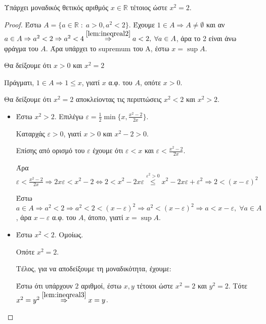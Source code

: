 \documentclass[main.tex]{subfiles}
\begin{document}
\begin{thm}
    Υπάρχει μοναδικός θετικός αριθμός $ x \in \mathbb{R} $ τέτοιος ώστε $ x^{2}=2 $.
\end{thm}

\begin{proof}
\item {}
    Έστω $ A = \{ a \in \mathbb{R} \; : \; a > 0, a^{2} < 2 \}  $. Έχουμε $ 1 \in A 
    \Rightarrow A \neq \emptyset $ 
    και αν $ a \in A \Rightarrow a^{2} < 2 \Rightarrow a^{2} < 4
    \overset{\ref{lem:ineqreal2}}{\Rightarrow} a <2,\; \forall a \in A $, 
    άρα το 2 είναι άνω φράγμα του $A$. Άρα υπάρχει το supremum του Α, έστω 
    $ x = \sup A $. 
    
    Θα δείξουμε ότι $ x > 0 $ και $ x^{2} = 2 $

    Πράγματι, $ 1 \in A \Rightarrow 1 \leq x $, γιατί $x$ α.φ. του $A$, οπότε $ x >0 $.

    Θα δείξουμε ότι $ x^{2} = 2 $ αποκλείοντας τις περιπτώσεις $ x^{2} <2 $ και 
    $ x^{2} > 2 $.
    \begin{itemize}
        \item Έστω $ x^{2} > 2 $. Επιλέγω $ \varepsilon = \frac{1}{2} \min \{ x, 
            \frac{x^{2}-2}{2x}\} $.
            
            Καταρχάς $ \varepsilon > 0 $, γιατί $ x>0 $ και $ x^{2} -2 >0 $. 
            
            Επίσης από ορισμό του $ \varepsilon $ έχουμε ότι  $\varepsilon < x $ και 
            $ \varepsilon < \frac{x^{2}-2}{2x}$. 

            Άρα $ \varepsilon < \frac{x^{2}-2}{2x} \Rightarrow 
            2x \varepsilon < x^{2} - 2 \Leftrightarrow 2 < x^{2} -2x \varepsilon 
            \overset{\varepsilon ^{2}>0}{\leq}
            x^{2} -2x \varepsilon + \varepsilon ^{2} \Rightarrow 2 
            < (x- \varepsilon )^{2}   $

            Έστω $ a \in A \Rightarrow a^{2} <2 \Rightarrow a^{2}<2< 
            (x- \varepsilon )^{2} \Rightarrow a^{2}< (x- \varepsilon )^{2} 
            \Rightarrow a < x- \varepsilon, \; \forall a \in A$, 
            άρα $ x - \varepsilon $ α.φ. του $A$, άτοπο, γιατί $ x= \sup A $.

        \item Έστω $ x^{2}<2 $. Ομοίως.

            Οπότε $ x^{2}=2 $. 

            Τέλος, για να αποδείξουμε τη μοναδικότητα, έχουμε:

            Έστω ότι υπάρχουν $ 2 $ αριθμοί, έστω $ x,y $ τέτοιοι ώστε $ x^{2} =2 $ 
            και $ y^{2}=2 $. Τότε $ x^{2}=y^{2} \overset{\ref{lem:ineqreal3}}
            {\Rightarrow} x =y $.
    \end{itemize}
\end{proof}
\end{document}
